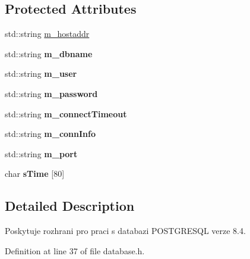 \subsection*{Protected Attributes}
\begin{DoxyCompactItemize}
\item 
std::string \hyperlink{classDatabase_a73a3ea4197118649af11db64a0905f26}{m\_\-hostaddr}
\item 
\hypertarget{classDatabase_a70b977fa3e19a4246e7db483dcd8761d}{
std::string {\bfseries m\_\-dbname}}
\label{classDatabase_a70b977fa3e19a4246e7db483dcd8761d}

\item 
\hypertarget{classDatabase_a3c452d6af7dbb3a1d43a0af8a52925ca}{
std::string {\bfseries m\_\-user}}
\label{classDatabase_a3c452d6af7dbb3a1d43a0af8a52925ca}

\item 
\hypertarget{classDatabase_a3162a928df727ca310429e7e1898ce2e}{
std::string {\bfseries m\_\-password}}
\label{classDatabase_a3162a928df727ca310429e7e1898ce2e}

\item 
\hypertarget{classDatabase_a011133e8aee26f47cecc85bf23c4172f}{
std::string {\bfseries m\_\-connectTimeout}}
\label{classDatabase_a011133e8aee26f47cecc85bf23c4172f}

\item 
\hypertarget{classDatabase_a694c89f3fbedd3ca436a77879839a741}{
std::string {\bfseries m\_\-connInfo}}
\label{classDatabase_a694c89f3fbedd3ca436a77879839a741}

\item 
\hypertarget{classDatabase_a00d646c476f717ca940a96dd246e198d}{
std::string {\bfseries m\_\-port}}
\label{classDatabase_a00d646c476f717ca940a96dd246e198d}

\item 
\hypertarget{classDatabase_ab85622620a91d68830ee429f0cea4eb9}{
char {\bfseries sTime} \mbox{[}80\mbox{]}}
\label{classDatabase_ab85622620a91d68830ee429f0cea4eb9}

\end{DoxyCompactItemize}


\subsection{Detailed Description}
Poskytuje rozhrani pro praci s databazi POSTGRESQL verze 8.4. 

Definition at line 37 of file database.h.



